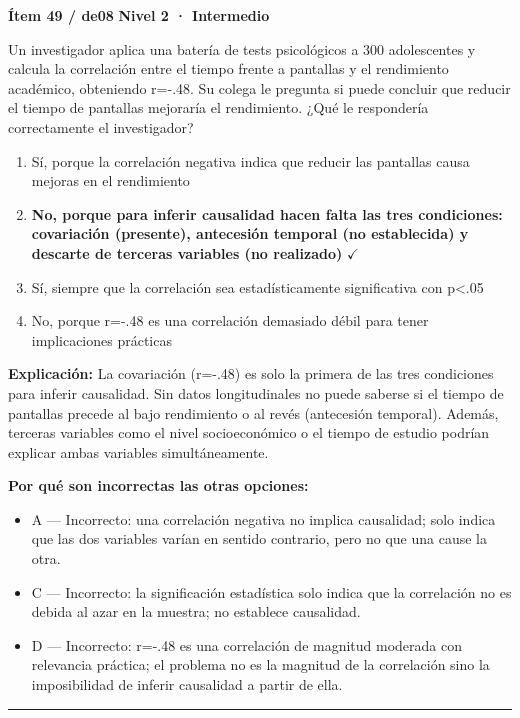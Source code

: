 \documentclass[12pt,a4paper]{article}
\begin{document}
\begin{mdframed}[backgroundcolor=fondogris,linecolor=ambar,linewidth=1pt,innerleftmargin=10pt,innerrightmargin=10pt,innertopmargin=7pt,innerbottommargin=7pt]
\textbf{Ítem 49 / de08} \hfill {\small\bfseries\color{ambar} Nivel 2 · Intermedio}
\end{mdframed}

Un investigador aplica una batería de tests psicológicos a 300 adolescentes y calcula la correlación entre el tiempo frente a pantallas y el rendimiento académico, obteniendo r=-.48. Su colega le pregunta si puede concluir que reducir el tiempo de pantallas mejoraría el rendimiento. ¿Qué le respondería correctamente el investigador?

\begin{enumerate}
  \item[A.] Sí, porque la correlación negativa indica que reducir las pantallas causa mejoras en el rendimiento
  \item[\textbf{\color{verde}B.}] \textbf{\color{verde} No, porque para inferir causalidad hacen falta las tres condiciones: covariación (presente), antecesión temporal (no establecida) y descarte de terceras variables (no realizado)} \hfill $\checkmark$
  \item[C.] Sí, siempre que la correlación sea estadísticamente significativa con p<.05
  \item[D.] No, porque r=-.48 es una correlación demasiado débil para tener implicaciones prácticas
\end{enumerate}

\noindent\textbf{\color{azul}Explicación:} La covariación (r=-.48) es solo la primera de las tres condiciones para inferir causalidad. Sin datos longitudinales no puede saberse si el tiempo de pantallas precede al bajo rendimiento o al revés (antecesión temporal). Además, terceras variables como el nivel socioeconómico o el tiempo de estudio podrían explicar ambas variables simultáneamente.

\noindent\textbf{\color{gris}Por qué son incorrectas las otras opciones:}
\begin{itemize}
  \item {\small A — Incorrecto: una correlación negativa no implica causalidad; solo indica que las dos variables varían en sentido contrario, pero no que una cause la otra.}
  \item {\small C — Incorrecto: la significación estadística solo indica que la correlación no es debida al azar en la muestra; no establece causalidad.}
  \item {\small D — Incorrecto: r=-.48 es una correlación de magnitud moderada con relevancia práctica; el problema no es la magnitud de la correlación sino la imposibilidad de inferir causalidad a partir de ella.}
\end{itemize}
\vspace{8pt}\hrule\vspace{10pt}
\end{document}
